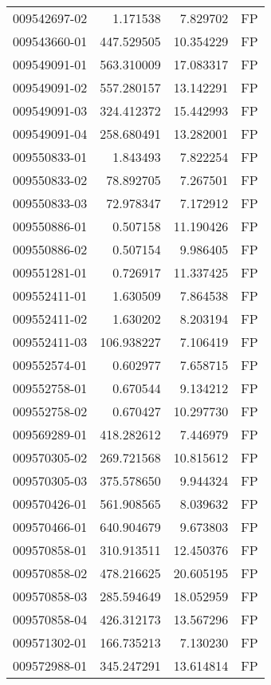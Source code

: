 \begin{tabular}{lrrl}
009542697-02 &    1.171538 &     7.829702 &   FP \\
009543660-01 &  447.529505 &    10.354229 &   FP \\
009549091-01 &  563.310009 &    17.083317 &   FP \\
009549091-02 &  557.280157 &    13.142291 &   FP \\
009549091-03 &  324.412372 &    15.442993 &   FP \\
009549091-04 &  258.680491 &    13.282001 &   FP \\
009550833-01 &    1.843493 &     7.822254 &   FP \\
009550833-02 &   78.892705 &     7.267501 &   FP \\
009550833-03 &   72.978347 &     7.172912 &   FP \\
009550886-01 &    0.507158 &    11.190426 &   FP \\
009550886-02 &    0.507154 &     9.986405 &   FP \\
009551281-01 &    0.726917 &    11.337425 &   FP \\
009552411-01 &    1.630509 &     7.864538 &   FP \\
009552411-02 &    1.630202 &     8.203194 &   FP \\
009552411-03 &  106.938227 &     7.106419 &   FP \\
009552574-01 &    0.602977 &     7.658715 &   FP \\
009552758-01 &    0.670544 &     9.134212 &   FP \\
009552758-02 &    0.670427 &    10.297730 &   FP \\
009569289-01 &  418.282612 &     7.446979 &   FP \\
009570305-02 &  269.721568 &    10.815612 &   FP \\
009570305-03 &  375.578650 &     9.944324 &   FP \\
009570426-01 &  561.908565 &     8.039632 &   FP \\
009570466-01 &  640.904679 &     9.673803 &   FP \\
009570858-01 &  310.913511 &    12.450376 &   FP \\
009570858-02 &  478.216625 &    20.605195 &   FP \\
009570858-03 &  285.594649 &    18.052959 &   FP \\
009570858-04 &  426.312173 &    13.567296 &   FP \\
009571302-01 &  166.735213 &     7.130230 &   FP \\
009572988-01 &  345.247291 &    13.614814 &   FP \\

\end{tabular}
